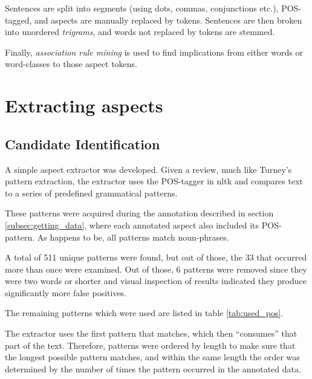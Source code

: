 \documentclass[a4paper,11pt]{kth-mag}
\begin{document}
Sentences are split into segments (using dots, commas, conjunctions etc.), POS-tagged, and aspects are
manually replaced by tokens. Sentences are then broken into unordered \emph{trigrams},
and words not replaced by tokens are stemmed.

Finally, \emph{association rule mining}\cite{ma1998integrating} is used to find implications
from either words or word-classes to those aspect tokens.

%




\section{Extracting aspects}
\subsection{Candidate Identification}
A simple aspect extractor was developed. Given a review, much like Turney's pattern extraction,
the extractor uses the POS-tagger in nltk\cite{nltk} and
compares text to a series of predefined grammatical patterns.

These patterns were acquired during the annotation described in section \ref{subsec:getting_data},
where each annotated aspect also included its POS-pattern. As happens to be, all patterns match noun-phrases.

A total of 511 unique patterns were found, but out of those, the 33 that occurred more than
once were examined. Out of those, 6 patterns were removed since they were two words or shorter
and visual inspection of results indicated they produce significantly more false positives.

The remaining patterns which were used are listed in table \ref{tab:used_pos}.

The extractor uses the first pattern that matches, which then ``consumes'' that part of the text.
Therefore, patterns were ordered by length to make sure that the longest possible pattern
matches, and within the same length the order was determined by
the number of times the pattern occurred in the annotated data.
\end{document}
